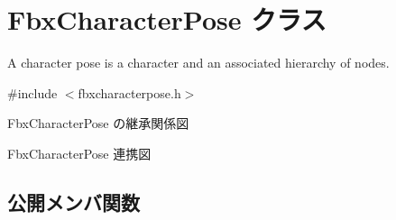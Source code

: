 \hypertarget{class_fbx_character_pose}{}\section{Fbx\+Character\+Pose クラス}
\label{class_fbx_character_pose}


A character pose is a character and an associated hierarchy of nodes.  




{\ttfamily \#include $<$fbxcharacterpose.\+h$>$}



Fbx\+Character\+Pose の継承関係図


Fbx\+Character\+Pose 連携図
\subsection*{公開メンバ関数}
